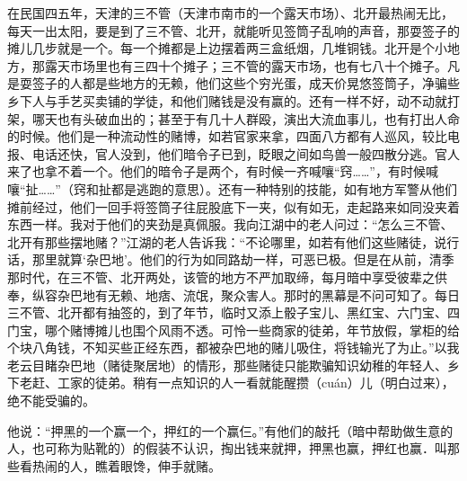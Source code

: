 \documentclass[12pt,UTF8]{ctexbook}
\begin{document}
在民国四五年，天津的三不管（天津市南市的一个露天市场）、北开最热闹无比，每天一出太阳，要是到了三不管、北开，就能听见签筒子乱响的声音，那耍签子的摊儿几步就是一个。每一个摊都是上边摆着两三盒纸烟，几堆铜钱。北开是个小地方，那露天市场里也有三四十个摊子；三不管的露天市场，也有七八十个摊子。凡是耍签子的人都是些地方的无赖，他们这些个穷光蛋，成天价晃悠签筒子，净骗些乡下人与手艺买卖铺的学徒，和他们赌钱是没有赢的。还有一样不好，动不动就打架，哪天也有头破血出的；甚至于有几十人群殴，演出大流血事儿，也有打出人命的时候。他们是一种流动性的赌博，如若官家来拿，四面八方都有人巡风，较比电报、电话还快，官人没到，他们暗令子已到，眨眼之间如鸟兽一般四散分逃。官人来了也拿不着一个。他们的暗令子是两个，有时候一齐喊嚷“窍……”，有时候喊嚷“扯……”（窍和扯都是逃跑的意思）。还有一种特别的技能，如有地方军警从他们摊前经过，他们一回手将签筒子往屁股底下一夹，似有如无，走起路来如同没夹着东西一样。我对于他们的夹劲是真佩服。我向江湖中的老人问过：“怎么三不管、北开有那些摆地赌？”江湖的老人告诉我：“不论哪里，如若有他们这些赌徒，说行话，那里就算‘杂巴地’。他们的行为如同路劫一样，可恶已极。但是在从前，清季那时代，在三不管、北开两处，该管的地方不严加取缔，每月暗中享受彼辈之供奉，纵容杂巴地有无赖、地痞、流氓，聚众害人。那时的黑幕是不问可知了。每日三不管、北开都有抽签的，到了年节，临时又添上骰子宝儿、黑红宝、六门宝、四门宝，哪个赌博摊儿也围个风雨不透。可怜一些商家的徒弟，年节放假，掌柜的给个块八角钱，不知买些正经东西，都被杂巴地的赌儿吸住，将钱输光了为止。”以我老云目睹杂巴地（赌徒聚居地）的情形，那些赌徒只能欺骗知识幼稚的年轻人、乡下老赶、工家的徒弟。稍有一点知识的人一看就能醒攒（cuán）儿（明白过来），绝不能受骗的。

他说：“押黑的一个赢一个，押红的一个赢仨。”有他们的敲托（暗中帮助做生意的人，也可称为贴靴的）的假装不认识，掏出钱来就押，押黑也赢，押红也赢．叫那些看热闹的人，瞧着眼馋，伸手就赌。
\end{document}
